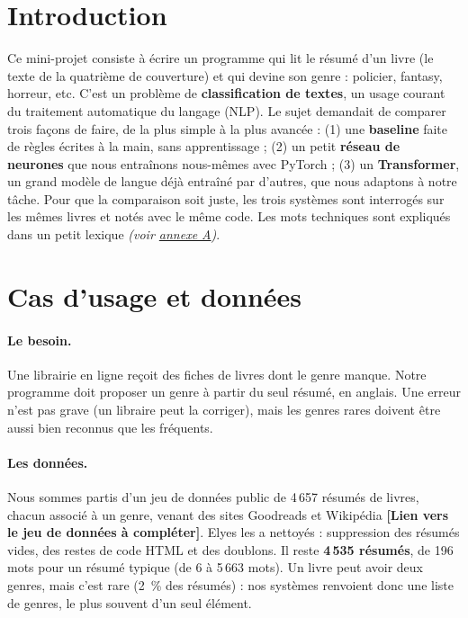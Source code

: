 \documentclass[11pt,a4paper]{article}
\newcommand{\afournir}[1]{\textbf{[#1 à compléter]}}
\newcommand{\voir}[2]{{\small\textit{(voir \hyperref[#1]{#2})}}}
\begin{document}
\section*{Introduction}
Ce mini-projet consiste à écrire un programme qui lit le résumé d'un livre (le texte de la quatrième de couverture) et qui devine son genre : policier, fantasy, horreur, etc. C'est un problème de \textbf{classification de textes}, un usage courant du traitement automatique du langage (NLP). Le sujet demandait de comparer trois façons de faire, de la plus simple à la plus avancée : (1) une \textbf{baseline} faite de règles écrites à la main, sans apprentissage ; (2) un petit \textbf{réseau de neurones} que nous entraînons nous-mêmes avec PyTorch ; (3) un \textbf{Transformer}, un grand modèle de langue déjà entraîné par d'autres, que nous adaptons à notre tâche. Pour que la comparaison soit juste, les trois systèmes sont interrogés sur les mêmes livres et notés avec le même code. Les mots techniques sont expliqués dans un petit lexique \voir{annexe:lexique}{annexe A}.

\section{Cas d'usage et données}

\paragraph{Le besoin.} Une librairie en ligne reçoit des fiches de livres dont le genre manque. Notre programme doit proposer un genre à partir du seul résumé, en anglais. Une erreur n'est pas grave (un libraire peut la corriger), mais les genres rares doivent être aussi bien reconnus que les fréquents.

\paragraph{Les données.} Nous sommes partis d'un jeu de données public de 4\,657 résumés de livres, chacun associé à un genre, venant des sites Goodreads et Wikipédia \afournir{Lien vers le jeu de données}. Elyes les a nettoyés : suppression des résumés vides, des restes de code HTML et des doublons. Il reste \textbf{4\,535 résumés}, de 196 mots pour un résumé typique (de 6 à 5\,663 mots). Un livre peut avoir deux genres, mais c'est rare (2~\% des résumés) : nos systèmes renvoient donc une liste de genres, le plus souvent d'un seul élément.
\end{document}
